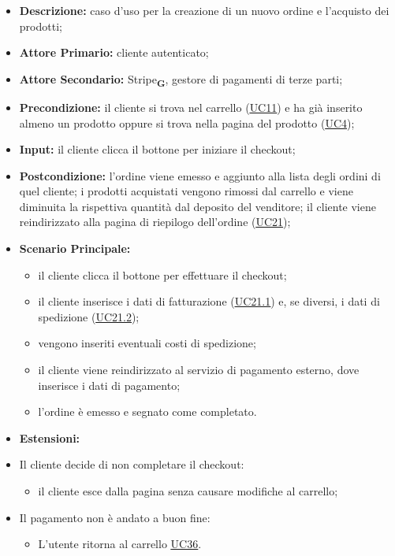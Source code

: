 \begin{itemize}
    \item \textbf{Descrizione:} caso d'uso per la creazione di un nuovo ordine e l'acquisto dei prodotti;
    \item \textbf{Attore Primario:} cliente autenticato;
    \item \textbf{Attore Secondario:} Stripe\textsubscript{\textbf{G}}, gestore di pagamenti di terze parti;
    \item \textbf{Precondizione:} il cliente si trova nel carrello (\hyperref[sec:UC11]{\underline{UC11}}) e ha già inserito almeno un prodotto oppure si trova nella pagina del prodotto (\hyperref[sec:UC4]{\underline{UC4}});
    \item \textbf{Input:} il cliente clicca il bottone per iniziare il checkout;
    \item \textbf{Postcondizione:} l'ordine viene emesso e aggiunto alla lista degli ordini di quel cliente; i prodotti acquistati vengono rimossi dal carrello e viene diminuita la rispettiva quantità dal deposito del venditore; il cliente viene reindirizzato alla pagina di riepilogo dell'ordine (\hyperref[sec:UC21]{\underline{UC21}});
    \item \textbf{Scenario Principale:}
          \begin{itemize}
              \item il cliente clicca il bottone per effettuare il checkout;
              \item il cliente inserisce i dati di fatturazione (\hyperref[sec:UC21.1]{\underline{UC21.1}}) e, se diversi, i dati di spedizione (\hyperref[sec:UC21.2]{\underline{UC21.2}});
              \item vengono inseriti eventuali costi di spedizione;
              \item il cliente viene reindirizzato al servizio di pagamento esterno, dove inserisce i dati di pagamento;
              \item l'ordine è emesso e segnato come completato.
          \end{itemize}
    \item \textbf{Estensioni:}
    \item Il cliente decide di non completare il checkout:
          \begin{itemize}
              \item  il cliente esce dalla pagina senza causare modifiche al carrello;
          \end{itemize}
    \item Il pagamento non è andato a buon fine:
          \begin{itemize}
              \item L'utente ritorna al carrello \hyperref[sec:UC36]{\underline{UC36}}.
          \end{itemize}
\end{itemize}

